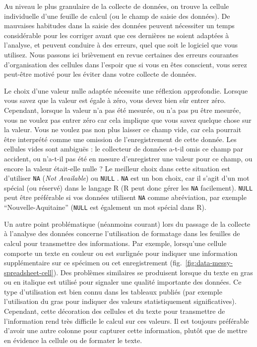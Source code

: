 \documentclass[
  french,
]{scrbook}
\begin{document}
Au niveau le plus granulaire de la collecte de données, on trouve la cellule individuelle d'une feuille de calcul (ou le champ de saisie des données). De mauvaises habitudes dans la saisie des données peuvent nécessiter un temps considérable pour les corriger avant que ces dernières ne soient adaptées à l'analyse, et peuvent conduire à des erreurs, quel que soit le logiciel que vous utilisez. Nous passons ici brièvement en revue certaines des erreurs courantes d'organisation des cellules dans l'espoir que si vous en êtes conscient, vous serez peut-être motivé pour les éviter dans votre collecte de données.

Le choix d'une valeur nulle adaptée nécessite une réflexion approfondie. Lorsque vous savez que la valeur est égale à zéro, vous devez bien sûr entrer zéro. Cependant, lorsque la valeur n'a pas été mesurée, ou n'a pas pu être mesurée, vous ne voulez pas entrer zéro car cela implique que vous savez quelque chose sur la valeur. Vous ne voulez pas non plus laisser ce champ vide, car cela pourrait être interprété comme une omission de l'enregistrement de cette donnée. Les cellules vides sont ambiguës : le collecteur de données a-t-il omis ce champ par accident, ou n'a-t-il pas été en mesure d'enregistrer une valeur pour ce champ, ou encore la valeur était-elle nulle ? Le meilleur choix dans cette situation est d'utiliser \texttt{NA} (\emph{Not Available}) ou \texttt{NULL} \autocite{white2013}. \texttt{NA} est un bon choix, car il s'agit d'un mot spécial (ou réservé) dans le langage R (R peut donc gérer les \texttt{NA} facilement). \texttt{NULL} peut être préférable si vos données utilisent \texttt{NA} comme abréviation, par exemple ``Nouvelle-Aquitaine'' (\texttt{NULL} est également un mot spécial dans R).

Un autre point problématique (néanmoins courant) lors du passage de la collecte à l'analyse des données concerne l'utilisation de formatage dans les feuilles de calcul pour transmettre des informations. Par exemple, lorsqu'une cellule comporte un texte en couleur ou est surlignée pour indiquer une information supplémentaire sur ce spécimen ou cet enregistrement (fig.~\ref{fig:data-messy-spreadsheet-cell}). Des problèmes similaires se produisent lorsque du texte en gras ou en italique est utilisé pour signaler une qualité importante des données. Ce type d'utilisation est bien connu dans les tableaux publiés (par exemple l'utilisation du gras pour indiquer des valeurs statistiquement significatives). Cependant, cette décoration des cellules et du texte pour transmettre de l'information rend très difficile le calcul sur ces valeurs. Il est toujours préférable d'avoir une autre colonne pour capturer cette information, plutôt que de mettre en évidence la cellule ou de formater le texte.
\end{document}
